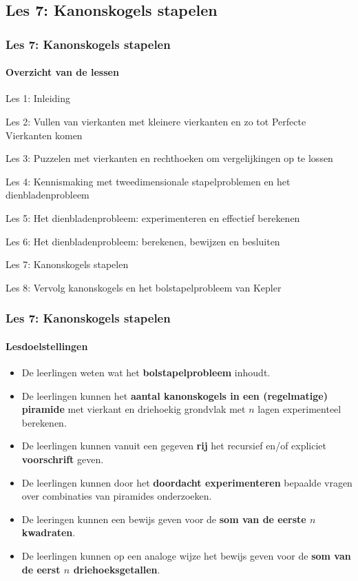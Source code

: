\documentclass[dutch]{beamer}
\begin{document}


\subsection{Les 7: Kanonskogels stapelen}
\begin{frame}
\frametitle{Les 7: Kanonskogels stapelen}
\framesubtitle{Overzicht van de lessen}
\begin{list}{\quad}{}
\item Les 1: Inleiding
\item Les 2: Vullen van vierkanten met kleinere vierkanten en zo tot Perfecte Vierkanten komen
\item Les 3: Puzzelen met vierkanten en rechthoeken om vergelijkingen op te lossen
\item Les 4: Kennismaking met tweedimensionale stapelproblemen en het dienbladenprobleem 
\item Les 5: Het dienbladenprobleem: experimenteren en effectief berekenen
\item Les 6: Het dienbladenprobleem: berekenen, bewijzen en besluiten
\item {\color{blue}Les 7: Kanonskogels stapelen}
\item Les 8: Vervolg kanonskogels en het bolstapelprobleem van Kepler
\end{list}
\end{frame}

\begin{frame}
\frametitle{Les 7: Kanonskogels stapelen}
\framesubtitle{Lesdoelstellingen}
\begin{itemize}
\item De leerlingen weten wat het \textbf{bolstapelprobleem} inhoudt.
\item De leerlingen kunnen het \textbf{aantal kanonskogels in een (regelmatige) piramide} met vierkant en driehoekig grondvlak met $n$ lagen experimenteel berekenen.
\item De leerlingen kunnen vanuit een gegeven \textbf{rij} het recursief en/of expliciet \textbf{voorschrift} geven.
\item De leerlingen kunnen door het \textbf{doordacht experimenteren} bepaalde vragen over combinaties van piramides onderzoeken.
\item De leeringen kunnen een bewijs geven voor de \textbf{som van de eerste $n$ kwadraten}.
\item De leerlingen kunnen op een analoge wijze het bewijs geven voor de \textbf{som van de eerst $n$ driehoeksgetallen}.
\end{itemize}
\end{frame}
\end{document}
